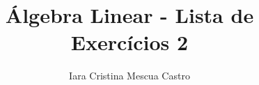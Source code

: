 \documentclass[leqno]{article}
\begin{document}
	
	\newtheorem{teo}{Teorema}[section] \newtheorem*{teo*}{Teorema}
	\newtheorem{prop}[teo]{Proposição} \newtheorem*{prop*}{Proposição}
	\newtheorem{lema}[teo]{Lemma} \newtheorem*{lema*}{Lema}
	\newtheorem{cor}[teo]{Corolário} \newtheorem*{cor*}{Corolário}
	
	\theoremstyle{definition}
	\newtheorem{defi}[teo]{Definição} \newtheorem*{defi*}{Definição}
	\newtheorem{exem}[teo]{Exemplo} \newtheorem*{exem*}{Exemplo}
	\newtheorem{obs}[teo]{Observação} \newtheorem*{obs*}{Observação}
	\newtheorem*{hipo}{Hipóteses}
	\newtheorem*{nota}{Notação}
	
	\newcommand{\ds}{\displaystyle} \newcommand{\nl}{\newline}
	\newcommand{\eps}{\varepsilon} \newcommand{\ssty}{\scriptstyle}
	\newcommand{\bE}{\mathbb{E}}
	\newcommand{\cB}{\mathcal{B}}
	\newcommand{\cF}{\mathcal{F}}
	\newcommand{\cA}{\mathcal{A}}
	\newcommand{\cM}{\mathcal{M}}
	\newcommand{\cD}{\mathcal{D}}
	\newcommand{\cN}{\mathcal{N}}
	\newcommand{\cL}{\mathcal{L}}
	\newcommand{\cLN}{\mathcal{LN}}
	\newcommand{\bP}{\mathbb{P}}
	\newcommand{\bQ}{\mathbb{Q}}
	\newcommand{\bN}{\mathbb{N}}
	\newcommand{\bR}{\mathbb{R}}
	\newcommand{\bZ}{\mathbb{Z}}
	
	\newcommand{\bfw}{\mathbf{w}}
	\newcommand{\bfv}{\mathbf{v}}
	\newcommand{\bfu}{\mathbf{u}}
	
	\newenvironment{sol}
	{
		\vspace{4mm}
		\noindent\textbf{Resolução:}
		\strut\newline
		\smallskip
		\hspace{-3.5mm}
	}
	{}
	
	\newcommand{\bvecc}[2]{%
		\begin{bmatrix} #1 \\ #2  \end{bmatrix}
	}
	\newcommand{\bveccc}[3]{%
		\begin{bmatrix} #1 \\ #2 \\ #3  \end{bmatrix}
	}
	
	
	\title{Álgebra Linear - Lista de Exercícios 2}
	
	\author{Iara Cristina Mescua Castro}
	
	\date{}
	
	\maketitle
	
\end{document}
